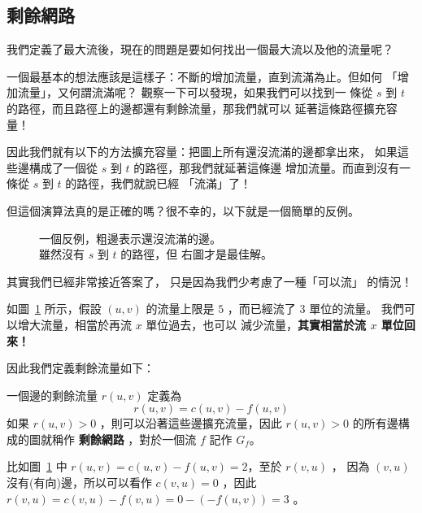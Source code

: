 \documentclass[a4paper,12pt]{book}
\begin{document}
\subsection{剩餘網路}
我們定義了最大流後，現在的問題是要如何找出一個最大流以及他的流量呢？

一個最基本的想法應該是這樣子：不斷的增加流量，直到流滿為止。但如何
「增加流量」，又何謂流滿呢？ 觀察一下可以發現，如果我們可以找到一
條從 $s$ 到 $t$ 的路徑，而且路徑上的邊都還有剩餘流量，那我們就可以
延著這條路徑擴充容量！

\begin{figure}[H]
  \centering
  
\end{figure}

因此我們就有以下的方法擴充容量：把圖上所有還沒流滿的邊都拿出來，
如果這些邊構成了一個從 $s$ 到 $t$ 的路徑，那我們就延著這條邊
增加流量。而直到沒有一條從 $s$ 到 $t$ 的路徑，我們就說已經
「流滿」了！

但這個演算法真的是正確的嗎？很不幸的，以下就是一個簡單的反例。

\begin{figure}[H]
  \centering
  
  \caption{一個反例，粗邊表示還沒流滿的邊。\\雖然沒有 $s$ 到 $t$ 的路徑，但
  右圖才是最佳解。}
\end{figure}

其實我們已經非常接近答案了， 只是因為我們少考慮了一種「可以流」
的情況！

\begin{figure}[H]
  \centering
  
  \caption{}
  \label{fig:flow4}
\end{figure}

如圖~\ref{fig:flow4} 所示，假設 $(u, v)$ 的流量上限是 $5$ ，而已經流了
$3$ 單位的流量。 我們可以增大流量，相當於再流 $x$ 單位過去，也可以
減少流量，{\bf 其實相當於流 $x$ 單位回來！}

因此我們定義剩餘流量如下：

\begin{theorem}[定義]
  一個邊的{剩餘流量} $r(u, v)$ 定義為 \[ r(u, v) = c(u, v) - f(u, v) \]
  如果 $r(u, v) > 0$ ，則可以沿著這些邊擴充流量，因此 $r(u, v) > 0$ 
  的所有邊構成的圖就稱作 {\bf 剩餘網路} ，對於一個流 $f$ 記作 $G_f$。
\end{theorem}
比如圖~\ref{fig:flow4} 中 $r(u, v) = c(u, v) - f(u, v) = 2$，至於 $r(v, u)$ ，
因為 $(v, u)$ 沒有(有向)邊，所以可以看作 $c(v, u) = 0$ ，因此 $r(v, u) = 
c(v, u) - f(v, u) = 0 - (- f(u, v)) = 3$ 。
\end{document}
